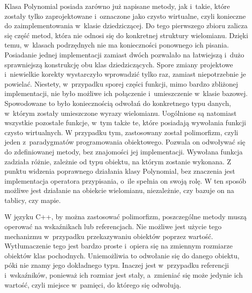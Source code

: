 Klasa Polynomial posiada zarówno już napisane metody, jak i~takie, które zostały tylko zaprojektowane i~oznaczone jako czysto wirtualne, czyli konieczne do zaimplementowania w~klasie dziedziczącej. Do tego pierwszego zbioru zalicza się część metod, która nie odnosi się do konkretnej struktury wielomianu. Dzięki temu, w~klasach podrzędnych nie ma konieczności ponownego ich pisania. Posiadanie jednej implementacji zamiast dwóch pozwalało na łatwiejszą i~dużo sprawniejszą konstrukcję obu klas dziedziczących. Spore zmiany projektowe i~niewielkie korekty wystarczyło wprowadzić tylko raz, zamiast niepotrzebnie je powielać. Niestety, w~przypadku sporej części funkcji, mimo bardzo zbliżonej implementacji, nie było możliwe ich połączenie i~umieszczenie w~klasie bazowej. Spowodowane to było koniecznością odwołań do konkretnego typu danych, w~którym zostały umieszczone wyrazy wielomianu. Uogólnione są natomiast wszystkie pozostałe funkcje, w~tym także te, które posiadają wywołania funkcji czysto wirtualnych. W przypadku tym, zastosowany został polimorfizm, czyli jeden z~paradygmatów programowania obiektowego. Pozwala on odwoływać się do zdefiniowanej metody, bez znajomości jej implementacji. Wywołana funkcja zadziała różnie, zależnie od typu obiektu, na którym zostanie wykonana. Z punktu widzenia poprawnego działania klasy Polynomial, bez znaczenia jest implementacja operatora przypisania, o~ile spełnia on swoją rolę. W ten sposób możliwe jest działanie na obiekcie wielomianu, niezależnie, czy bazuje on na tablicy, czy mapie.

W języku C++, by można zastosować polimorfizm, poszczególne metody muszą operować na wskaźnikach lub referencjach. Nie możliwe jest użycie tego mechanizmu w~przypadku przekazywaniu obiektów poprzez wartość. Wytłumaczenie tego jest bardzo proste i~opiera się na zmiennym rozmiarze obiektów klas pochodnych. Uniemożliwia to odwołanie się do danego obiektu, póki nie znamy jego dokładnego typu. Inaczej jest w~przypadku referencji i~wskaźników, ponieważ ich rozmiar jest stały, a~zmieniać się może jedynie ich wartość, czyli miejsce w~pamięci, do którego się odwołują.

